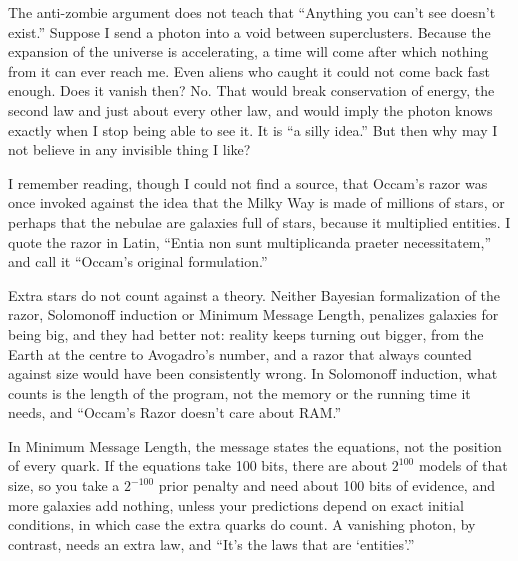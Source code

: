 
The anti-zombie argument does not teach that ``Anything you can't see doesn't exist.'' Suppose I send a photon into a void between superclusters. Because the expansion of the universe is accelerating, a time will come after which nothing from it can ever reach me. Even aliens who caught it could not come back fast enough. Does it vanish then? No. That would break conservation of energy, the second law and just about every other law, and would imply the photon knows exactly when I stop being able to see it. It is ``a silly idea.''  But then why may I not believe in any invisible thing I like?

I remember reading, though I could not find a source, that Occam's razor was once invoked against the idea that the Milky Way is made of millions of stars, or perhaps that the nebulae are galaxies full of stars, because it multiplied entities.  I quote the razor in Latin, ``Entia non sunt multiplicanda praeter necessitatem,'' and call it ``Occam's original formulation.'' 

Extra stars do not count against a theory. Neither Bayesian formalization of the razor, Solomonoff induction or Minimum Message Length, penalizes galaxies for being big, and they had better not: reality keeps turning out bigger, from the Earth at the centre to Avogadro's number, and a razor that always counted against size would have been consistently wrong. In Solomonoff induction, what counts is the length of the program, not the memory or the running time it needs, and ``Occam's Razor doesn't care about RAM.'' 

In Minimum Message Length, the message states the equations, not the position of every quark. If the equations take 100 bits, there are about $2^{100}$ models of that size, so you take a $2^{-100}$ prior penalty and need about 100 bits of evidence, and more galaxies add nothing, unless your predictions depend on exact initial conditions, in which case the extra quarks do count. A vanishing photon, by contrast, needs an extra law, and ``It's the laws that are `entities'.''

